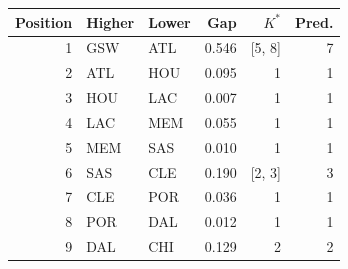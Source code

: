 \begin{tabular}{rllrrr}
\toprule
Position & Higher & Lower & Gap & $K^*$ & Pred. \\
\midrule
1 & GSW & ATL & 0.546 & [5, 8] & 7 \\
2 & ATL & HOU & 0.095 & 1 & 1 \\
3 & HOU & LAC & 0.007 & 1 & 1 \\
4 & LAC & MEM & 0.055 & 1 & 1 \\
5 & MEM & SAS & 0.010 & 1 & 1 \\
6 & SAS & CLE & 0.190 & [2, 3] & 3 \\
7 & CLE & POR & 0.036 & 1 & 1 \\
8 & POR & DAL & 0.012 & 1 & 1 \\
9 & DAL & CHI & 0.129 & 2 & 2 \\
\bottomrule
\end{tabular}

